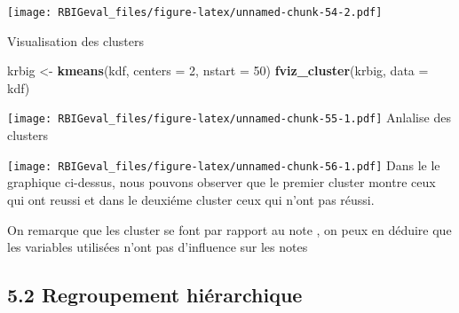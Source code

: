 \documentclass[
]{article}
\newenvironment{Shaded}{\begin{snugshade}}{\end{snugshade}}
\newcommand{\DataTypeTok}[1]{\textcolor[rgb]{0.13,0.29,0.53}{#1}}
\newcommand{\DecValTok}[1]{\textcolor[rgb]{0.00,0.00,0.81}{#1}}
\newcommand{\KeywordTok}[1]{\textcolor[rgb]{0.13,0.29,0.53}{\textbf{#1}}}
\newcommand{\NormalTok}[1]{#1}
\newcommand{\OperatorTok}[1]{\textcolor[rgb]{0.81,0.36,0.00}{\textbf{#1}}}
\newcommand{\StringTok}[1]{\textcolor[rgb]{0.31,0.60,0.02}{#1}}
\begin{document}
\texttt{[image: RBIGeval\_files/figure-latex/unnamed-chunk-54-2.pdf]}

Visualisation des clusters

\begin{Shaded}
\begin{Highlighting}[]
\NormalTok{krbig <-}\StringTok{ }\KeywordTok{kmeans}\NormalTok{(kdf, }\DataTypeTok{centers =} \DecValTok{2}\NormalTok{, }\DataTypeTok{nstart =} \DecValTok{50}\NormalTok{)}
\KeywordTok{fviz_cluster}\NormalTok{(krbig, }\DataTypeTok{data =}\NormalTok{ kdf)}
\end{Highlighting}
\end{Shaded}

\texttt{[image: RBIGeval\_files/figure-latex/unnamed-chunk-55-1.pdf]}
Anlalise des clusters

\begin{Shaded}
\end{Shaded}

\texttt{[image: RBIGeval\_files/figure-latex/unnamed-chunk-56-1.pdf]}
Dans le le graphique ci-dessus, nous pouvons observer que le premier
cluster montre ceux qui ont reussi et dans le deuxiéme cluster ceux qui
n'ont pas réussi.

On remarque que les cluster se font par rapport au note , on peux en
déduire que les variables utilisées n'ont pas d'influence sur les notes

\hypertarget{regroupement-hiuxe9rarchique}{%
\subsection{5.2 Regroupement
hiérarchique}\label{regroupement-hiuxe9rarchique}}
\end{document}

